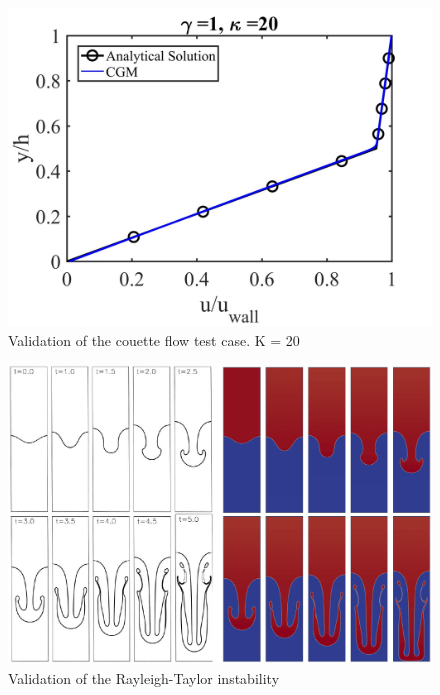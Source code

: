 \documentclass[12pt, openany]{book}
\begin{document}
    \begin{figure}[H]
       	\centering
       	\includegraphics[width=\linewidth]{Resources/Images/AntonioValid/E_G1_K20.jpg}
       	\caption{Validation of the couette flow test case. K = 20}
       	\label{fig:couett20}
    \end{figure}
    
    \begin{figure}[H]
       	\centering
       	\includegraphics[width=\linewidth]{Resources/Images/AntonioValid/RTI_Re256.PNG}
       	\caption{Validation of the Rayleigh-Taylor instability}
       	\label{fig:rtvalid}
    \end{figure}
    
\end{document}
